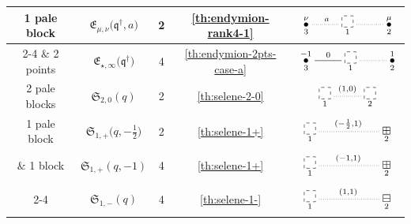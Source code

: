 \documentclass[pdftex]{sigma}
\numberwithin{equation}{section}
\newcommand{\sele}{\mathfrak{S}}
\newcommand{\eny}{\mathfrak{E}}
\newcommand{\enyIIb}[1]{\eny_{\star,#1}}
\newcommand{\bq}{\mathfrak{q}}
\newcommand{\bqs}{\bq^{\dagger}}
\begin{document}
\begin{table}[ht]
\begin{tabular}{c| c c c |c}
{\small 1 pale block}
& $\eny_{\mu, \nu}\big(\bqs, a\big)$ & 2 & \ref{th:endymion-rank4-1} & $\xymatrix{
\overset{\nu}{\underset{3}{\bullet}} \ar@{.}^{a}[r]
&\underset{1}{\begin{tikzpicture}
\draw[dashed] (0,0) rectangle (0.36,0.36);
\end{tikzpicture}} \ar @{.}[r]
& \overset{\mu}{\underset{2}{\bullet}}}$
\\ \cline{2-4}
$\&$ {\small 2 points} & $\enyIIb{\infty}\big(\bqs\big)$ & 4 & \ref{th:endymion-2pts-case-a} &
$\xymatrix{
\overset{-1}{\underset{3}{\bullet}} \ar@{-}^{0}[r]
&\underset{1}{\begin{tikzpicture}
\draw[dashed] (0,0) rectangle (0.36,0.36);
\end{tikzpicture}} \ar @{.}[r]
& \overset{1}{\underset{2}{\bullet}}}$
\\ \hline
{\small 2 pale blocks} & $\sele_{2,0}(q)$ & 2 & \ref{th:selene-2-0} &
$\xymatrix{
\underset{1}{\begin{tikzpicture}
\draw[dashed] (0,0) rectangle (0.36,0.36);
\end{tikzpicture}} \ar@{.}^{(1,0)}[r]
&\underset{2}{\begin{tikzpicture}
\draw[dashed] (0,0) rectangle (0.36,0.36);
\end{tikzpicture}} }$
\\ \hline
{\small 1 pale block}
& $\sele_{1,+}\big(q,-\frac12\big)$ & 2 &\ref{th:selene-1+}
& $
\xymatrix{
\underset{1}{\begin{tikzpicture}
\draw[dashed] (0,0) rectangle (0.36,0.36);
\end{tikzpicture}} \ar @{.}^{(-\frac12,1)}[rr]
& &\underset{2}{\boxplus}}$
\\
$\&$ {\small 1 block}
& $\sele_{1,+}(q,-1)$ & 4 &\ref{th:selene-1+}
& $
\xymatrix{
\underset{1}{\begin{tikzpicture}
\draw[dashed] (0,0) rectangle (0.36,0.36);
\end{tikzpicture}} \ar @{.}^{(-1,1)}[rr]
& &\underset{2}{\boxplus}}$
\\ \cline{2-4}
& $\sele_{1,-}(q)$ & 4 &\ref{th:selene-1-}
& $ \xymatrix{ \underset{1}{\begin{tikzpicture}
\draw[dashed] (0,0) rectangle (0.36,0.36);
\end{tikzpicture}} \ar @{.}^{(1,1)}[rr]
& &\underset{2}{\boxminus}}$
\\
\hline
\end{tabular}
\end{table}
\end{document}
